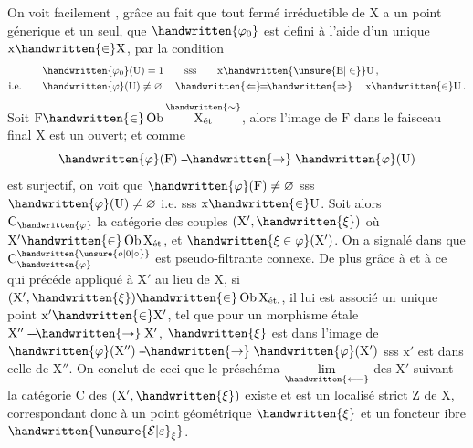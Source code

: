 \begin{lrbox}{\coteFourTypescript}
\begin{minipage}[t]{.96\linewidth}
On voit facilement , grâce au fait que tout fermé irréductible de $\mathrm X$ a un point génerique et un seul, que $\handwritten{\varphi_{0}}$ est defini à l'aide d'un  unique $\mathrm x\handwritten{\in}\mathrm X$, par la condition
\[
\begin{aligned}
&\handwritten{\varphi_{0}}(\mathrm U)=1\qquad\text{sss}\qquad \mathrm x\handwritten{\unsure{\mathrm E|\in}}\mathrm U\,,\\
\text{i.e.}\qquad &\handwritten{\varphi}(\mathrm U)\ne\varnothing\quad \mathrel{\handwritten{\Leftarrow}\mkern-7mu=\mkern-7mu\handwritten{\Rightarrow}}\quad \mathrm x\handwritten{\in}\mathrm U\,.
\end{aligned}
\]
Soit $\mathrm F\handwritten{\in}\operatorname{Ob}\overset{\handwritten{\sim}}{\mathrm X_{\text{ét}}}$, alors l'image de $\mathrm F$ dans le faisceau final $\mathrm X$ est un ouvert; et comme
\[
\handwritten{\varphi}(\mathrm F)\mathrel{\mbox{-}\mkern-2mu\mbox{-}\mkern-3mu\handwritten{\to}}\handwritten{\varphi}(\mathrm U)
\]
est surjectif, on voit que $\handwritten{\varphi}(\mathrm F)\ne\varnothing$ sss $\handwritten{\varphi}(\mathrm U)\ne\varnothing$ i.e. sss $\mathrm x\handwritten{\in}\mathrm U$. Soit alors $\mathrm C_{\handwritten{\varphi}}$ la catégorie des couples $(\mathrm X',\handwritten{\xi})$ où $\mathrm X'\handwritten{\in}\operatorname{Ob}\mathrm X_{\text{ét}}$, et $\handwritten{\xi\in\varphi}(\mathrm X')$. On a signalé dans  que $\mathrm C_{\handwritten{\varphi}}^{\handwritten{\unsure{o|0|\circ}}}$ est pseudo-filtrante connexe. De plus grâce à  et à ce qui précéde appliqué à $\mathrm X'$ au lieu de $\mathrm X$, si $(\mathrm X',\handwritten{\xi})\handwritten{\in}\operatorname{Ob}\mathrm X_{\text{ét.}}$, il lui est\unsure{:} associé un unique point $\mathrm x'\handwritten{\in}\mathrm X'$, tel que pour un morphisme étale $\mathrm X''\mathrel{\mbox{-}\mkern-2mu\mbox{-}\mkern-2mu\mbox{-}\mkern-3mu\handwritten{\to}}\mathrm X'$, $\handwritten{\xi}$ est dans l'image de $\handwritten{\varphi}(\mathrm X'')\mathrel{\mbox{-}\mkern-2mu\mbox{-}\mkern-3mu\handwritten{\to}}\handwritten{\varphi}(\mathrm X')$ sss $\mathrm x'$ est dans celle de $\mathrm X''$. On conclut de ceci que le préschéma $\underset{\handwritten{\longleftarrow}}{\lim}$ des $\mathrm X'$ suivant la catégorie $\mathrm C$ des $(\mathrm X',\handwritten{\xi})$ existe et est un localisé strict $\mathrm Z$ de $\mathrm X$, correspondant donc à un point géométrique $\handwritten{\xi}$ et un foncteur ibre $\handwritten{{\unsure{\mathcal E|\varepsilon}}_{\xi}}$.
\end{minipage}
\end{lrbox}
\noindent{}
